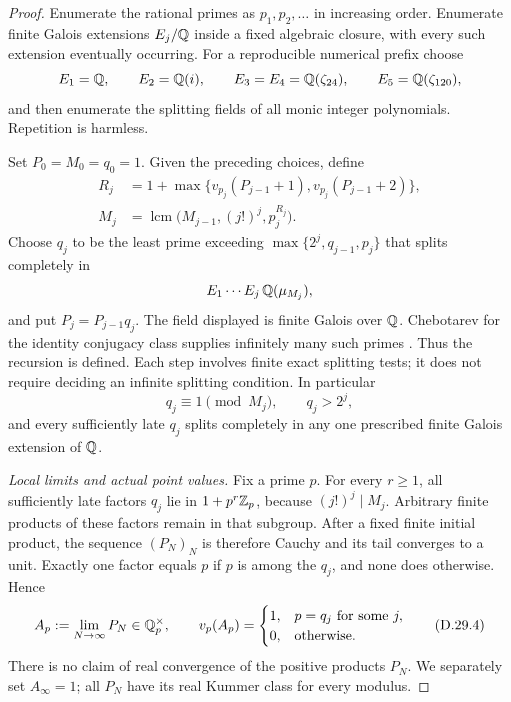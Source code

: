 \begin{proof}
Enumerate the rational primes as $p_1,p_2,\ldots$ in
increasing order. Enumerate finite Galois extensions
$E_j/\mathbb Q$ inside a fixed algebraic closure, with every such
extension eventually occurring. For a reproducible numerical
prefix choose
\[
 E_1=\mathbb Q,\qquad E_2=\mathbb Q(i),\qquad
 E_3=E_4=\mathbb Q(\zeta_{24}),\qquad E_5=\mathbb Q(\zeta_{120}),
\]
and then enumerate the splitting fields of all monic integer
polynomials. Repetition is harmless.

Set $P_0=M_0=q_0=1$. Given the preceding choices, define
\[
\begin{split}
 R_j&=1+\max\{v_{p_j}(P_{j-1}+1),
                         v_{p_j}(P_{j-1}+2)\},\\
 M_j&=\operatorname{lcm}
           \bigl(M_{j-1},(j!)^j,p_j^{R_j}\bigr).
\end{split}                                                \tag{D.29.2}
\]
Choose $q_j$ to be the least prime exceeding
$\max\{2^j,q_{j-1},p_j\}$ that splits completely in
\[
                    E_1\cdots E_j\,\mathbb Q(\mu_{M_j}),
\]
and put $P_j=P_{j-1}q_j$. The field displayed is finite
Galois over $\mathbb Q$. Chebotarev for the identity conjugacy
class supplies infinitely many such primes
\cite[Chapter V, Theorem 3.23, p.~164]{D_MilneCFT2020}.
Thus the recursion is defined. Each step involves finite
exact splitting tests; it does not require deciding an
infinite splitting condition. In particular
\[
 q_j\equiv1\pmod {M_j},\qquad q_j>2^j,                     \tag{D.29.3}
\]
and every sufficiently late $q_j$ splits completely in any
one prescribed finite Galois extension of $\mathbb Q$.

\emph{Local limits and actual point values.}
Fix a prime $p$. For every $r\ge1$, all sufficiently late
factors $q_j$ lie in $1+p^r\mathbb Z_p$, because
$(j!)^j\mid M_j$. Arbitrary finite products of these factors
remain in that subgroup. After a fixed finite initial
product, the sequence $(P_N)_N$ is therefore Cauchy and its
tail converges to a unit. Exactly one factor equals $p$ if
$p$ is among the $q_j$, and none does otherwise. Hence
\[
 A_p:=\lim_{N\to\infty}P_N\in\mathbb Q_p^\times,
 \qquad
 v_p(A_p)=
 \begin{cases}
  1,&p=q_j\text{ for some }j,\\
  0,&\text{otherwise}.
 \end{cases}                                               \tag{D.29.4}
\]
There is no claim of real convergence of the positive
products $P_N$. We separately set $A_\infty=1$; all $P_N$
have its real Kummer class for every modulus.


\end{proof}
